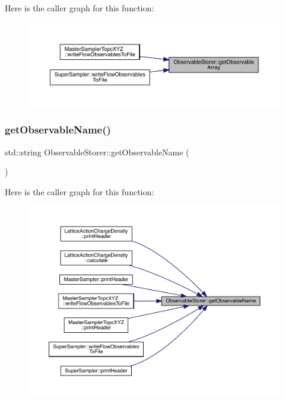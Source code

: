 Here is the caller graph for this function\+:
\nopagebreak
\begin{figure}[H]
\begin{center}
\leavevmode
\includegraphics[width=350pt]{class_observable_storer_ab8885ce7eb3baa3fdb39cda767be6c83_icgraph}
\end{center}
\end{figure}
\mbox{\label{class_observable_storer_aa04dd06fe053670f4c8f027aa744277a}} 
\subsubsection{\texorpdfstring{getObservableName()}{getObservableName()}}
{\footnotesize\ttfamily std\+::string Observable\+Storer\+::get\+Observable\+Name (\begin{DoxyParamCaption}{ }\end{DoxyParamCaption})\hspace{0.3cm}{\ttfamily [inline]}}

Here is the caller graph for this function\+:
\nopagebreak
\begin{figure}[H]
\begin{center}
\leavevmode
\includegraphics[width=350pt]{class_observable_storer_aa04dd06fe053670f4c8f027aa744277a_icgraph}
\end{center}
\end{figure}
\mbox{\label{class_observable_storer_a1eae8d9c9b4f9c60facc21a26b3bbb26}} 
